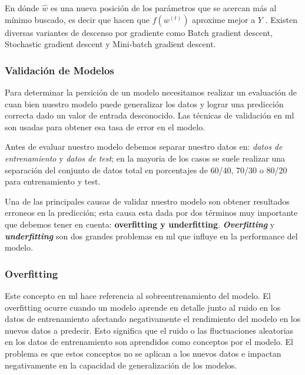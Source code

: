 En dónde $\hat{w}$ es una nueva posición de los parámetros que se acercan más al mínimo buscado, es decir que hacen que $f(w^{(t)})$ aproxime mejor a $Y$ . Existen diversas variantes de descenso por gradiente como Batch gradient descent, Stochastic gradient descent y Mini-batch gradient descent.


\subsubsection{Validación de Modelos}
Para determinar la persición de un modelo necesitamos realizar un evaluación de cuan bien nuestro modelo puede generalizar los datos y lograr una predicción correcta dado un valor de entrada desconocido. Las técnicas de validación en \ac{ml} son usadas para obtener esa tasa de error en el modelo.

Antes de evaluar nuestro modelo debemos separar nuestro datos en: \textit{datos de entrenamiento} y \textit{datos de test}; en la mayoria de los casos se suele realizar una separación del conjunto de datos total en porcentajes de 60/40, 70/30 o 80/20 para entrenamiento y test.

Una de las principales causas de validar nuestro modelo son obtener resultados erroneos en la predicción; esta causa esta dada por dos términos muy importante que debemos tener en cuenta: \textbf{ overfitting y underfitting}. \textit{\textbf{Overfitting}} y \textit{\textbf{underfitting}} son dos grandes problemas en \ac{ml} que influye en la performance del modelo. 

\subsubsection*{Overfitting}
Este concepto en \ac{ml} hace referencia al sobreentrenamiento del modelo. El overfitting ocurre cuando un modelo aprende en detalle junto al ruido en los datos de entrenamiento afectando negativamente el rendimiento del modelo en los nuevos datos a predecir. Esto significa que el ruido o las fluctuaciones aleatorias en los datos de entrenamiento son aprendidos como conceptos por el modelo. El problema es que estos conceptos no se aplican a los nuevos datos e impactan negativamente en la capacidad de generalización de los modelos.

